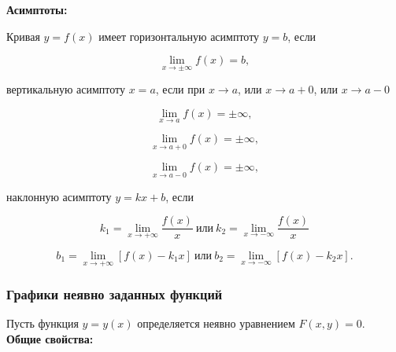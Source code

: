     \textbf{Асимптоты:}

    Кривая $y = f(x)$ имеет горизонтальную асимптоту $y = b$, если

    \[
        \lim_{x \rightarrow \pm \infty} f(x) = b,
    \]

вертикальную асимптоту $x = a$, если при $x \rightarrow a$, или $x \rightarrow a + 0$, или $x \rightarrow a - 0$

\[
\lim_{x \rightarrow a} f(x) = \pm \infty,
\]

\[
\lim_{x \rightarrow a + 0} f(x) = \pm \infty,
\]

\[
\lim_{x \rightarrow a - 0} f(x) = \pm \infty,
\]

наклонную асимптоту $y = k x + b$, если

\[
k_{1} = \lim_{x \rightarrow + \infty} \frac{f(x)}{x} \: \mbox{или} \: k_{2} = \lim_{x \rightarrow - \infty} \frac{f(x)}{x}
\]

\[
b_{1} = \lim_{x \rightarrow + \infty} \left[ f(x) - k_{1} x \right] \: \mbox{или} \: b_{2} = \lim_{x \rightarrow - \infty} \left[ f(x) - k_{2} x \right].
\]

\subsubsection{Графики неявно заданных функций}

Пусть функция $y = y \left( x \right)$ определяется неявно уравнением $F \left( x, y \right) = 0$.\\

\textbf{Общие свойства:}

